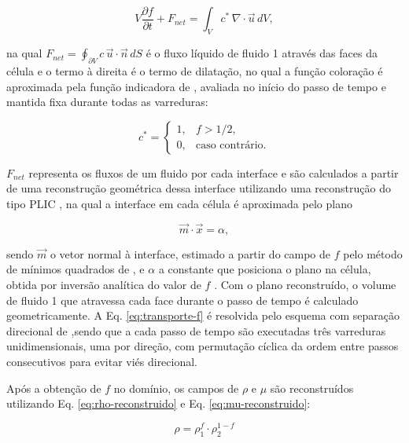 \begin{equation}
    V \frac{\partial f}{\partial t} + F_{net} = \int_{V} c^* \, \nabla \cdot \vec{u} \, dV,
    \label{eq:transporte-f}
\end{equation}

na qual $F_{net} = \oint_{\partial V} c \, \vec{u} \cdot \vec{n} \, dS$ é o fluxo líquido de fluido 1 através das faces da célula e o termo à direita é o termo de dilatação, no qual a função coloração é aproximada pela função indicadora de \citet{Weymouth2010}, avaliada no início do passo de tempo e mantida fixa durante todas as varreduras:

\begin{equation}
    c^* =
    \begin{cases}
        1, & f > 1/2, \\
        0, & \text{caso contrário.}
    \end{cases}
    \label{eq:indicadora-wy}
\end{equation}


$F_{net}$ representa os fluxos de um fluido por cada interface e são calculados a partir de uma reconstrução geométrica dessa interface utilizando uma reconstrução do tipo PLIC \citep{Youngs1982}, na qual a interface em cada célula é aproximada pelo plano

\begin{equation}
    \vec{m} \cdot \vec{x} = \alpha,
    \label{eq:plic}
\end{equation}

sendo $\vec{m}$ o vetor normal à interface, estimado a partir do campo de $f$ pelo método de mínimos quadrados de \citet{Aulisa2007}, e $\alpha$ a constante que posiciona o plano na célula, obtida por inversão analítica do valor de $f$ \citep{Scardovelli2000}. Com o plano reconstruído, o volume de fluido 1 que atravessa cada face durante o passo de tempo é calculado geometricamente. A Eq. \ref{eq:transporte-f} é resolvida pelo esquema com separação direcional de \citet{Weymouth2010},sendo que a cada passo de tempo são executadas três varreduras unidimensionais, uma por direção, com permutação cíclica da ordem entre passos consecutivos para evitar viés direcional.

Após a obtenção de $f$ no domínio, os campos de $\rho$ e $\mu$ são reconstruídos utilizando Eq. \ref{eq:rho-reconstruido} e Eq. \ref{eq:mu-reconstruido}:

\begin{equation}
    \rho = \rho_1^f \cdot \rho_2^{1-f}
    \label{eq:rho-reconstruido}
\end{equation}

